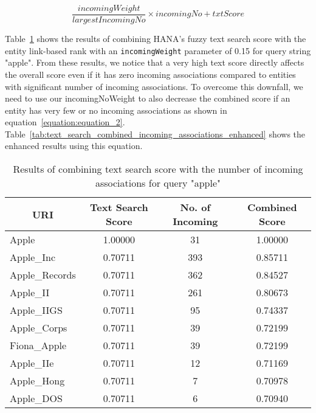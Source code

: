 \begin{equation}\label{equation:equation_1}
\frac{incomingWeight}{largestIncomingNo} \times incomingNo + txtScore
\end{equation}


Table~\ref{tab:text_search_combined_incoming_associations} shows the results of combining HANA's fuzzy text search score with the entity link-based rank with an \texttt{incomingWeight} parameter of 0.15 for query string "apple". From these results, we notice that a very high text score directly affects the overall score even if it has zero incoming associations compared to entities with significant number of incoming associations. To overcome this downfall, we need to use our incomingNoWeight to also decrease the combined score if an entity has very few or no incoming associations as shown in equation~\ref{equation:equation_2}. Table~\ref{tab:text_search_combined_incoming_associations_enhanced} shows the enhanced results using this equation.

\begin{table}
\centering
\begin{tabular}{|l|c|c|c|}
\hline
\multicolumn{1}{|c|}{{\bf URI}} & {\bf Text Search Score} & {\bf No. of Incoming} & {\bf Combined Score} \\ \hline
Apple                           & 1.00000                 & 31                    & 1.00000              \\ \hline
Apple\_Inc                      & 0.70711                 & 393                   & 0.85711              \\ \hline
Apple\_Records                  & 0.70711                 & 362                   & 0.84527              \\ \hline
Apple\_II                       & 0.70711                 & 261                   & 0.80673              \\ \hline
Apple\_IIGS                     & 0.70711                 & 95                    & 0.74337              \\ \hline
Apple\_Corps                    & 0.70711                 & 39                    & 0.72199              \\ \hline
Fiona\_Apple                    & 0.70711                 & 39                    & 0.72199              \\ \hline
Apple\_IIe                      & 0.70711                 & 12                    & 0.71169              \\ \hline
Apple\_Hong                     & 0.70711                 & 7                     & 0.70978              \\ \hline
Apple\_DOS                      & 0.70711                 & 6                     & 0.70940              \\ \hline
\end{tabular}
\caption{Results of combining text search score with the number of incoming associations for query "apple"}
\label{tab:text_search_combined_incoming_associations}
\end{table}

